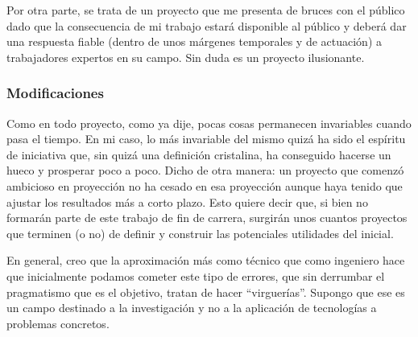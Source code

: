 \par Por otra parte, se trata de un proyecto que me presenta de bruces con el público dado que la consecuencia de mi trabajo estará disponible al público y deberá dar una respuesta fiable (dentro de unos márgenes temporales y de actuación) a trabajadores expertos en su campo. Sin duda es un proyecto ilusionante.

\subsubsection{Modificaciones}
\par Como en todo proyecto, como ya dije, pocas cosas permanecen invariables cuando pasa el tiempo. En mi caso, lo más invariable del mismo quizá ha sido el espíritu de iniciativa que, sin quizá una definición cristalina, ha conseguido hacerse un hueco y prosperar poco a poco. Dicho de otra manera: un proyecto que comenzó ambicioso en proyección no ha cesado en esa proyección aunque haya tenido que ajustar los resultados más a corto plazo. Esto quiere decir que, si bien no formarán parte de este trabajo de fin de carrera, surgirán unos cuantos proyectos que terminen (o no) de definir y construir las potenciales utilidades del inicial.
\par En general, creo que la aproximación más como técnico que como ingeniero hace que inicialmente podamos cometer este tipo de errores, que sin derrumbar el pragmatismo que es el objetivo, tratan de hacer ``virguerías''. Supongo que ese es un campo destinado a la investigación y no a la aplicación de tecnologías a problemas concretos.

